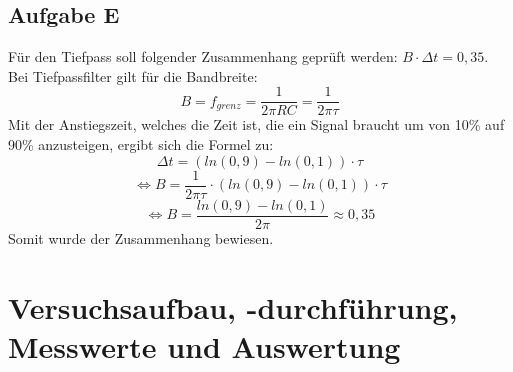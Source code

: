 \documentclass{article}
\begin{document}
\subsection*{Aufgabe E}
\label{subsec:afgE}
Für den Tiefpass soll folgender Zusammenhang geprüft werden:  $B\cdot \Delta t = 0,35$.\\
Bei Tiefpassfilter gilt für die Bandbreite: 
\begin{equation}
    B = f_{grenz} = \frac{1}{2\pi RC} = \frac{1}{2\pi \tau}
\end{equation}
Mit der Anstiegszeit, welches die Zeit ist, die ein Signal braucht um von 10\% auf 90\% anzusteigen, ergibt sich die Formel zu: \\
 \begin{equation*}
     \Delta t = (ln(0,9)-ln(0,1))\cdot \tau 
 \end{equation*}
 \begin{equation*}
     \iff B = \frac{1}{2\pi \tau} \cdot (ln(0,9)-ln(0,1))\cdot \tau 
 \end{equation*}
 \begin{equation*}
     \iff B = \frac{ln(0,9)-ln(0,1)}{2 \pi} \approx 0,35
 \end{equation*}
 Somit wurde der Zusammenhang bewiesen. 
 
\newpage
	\section{Versuchsaufbau, -durchführung, Messwerte und Auswertung}
\end{document}
